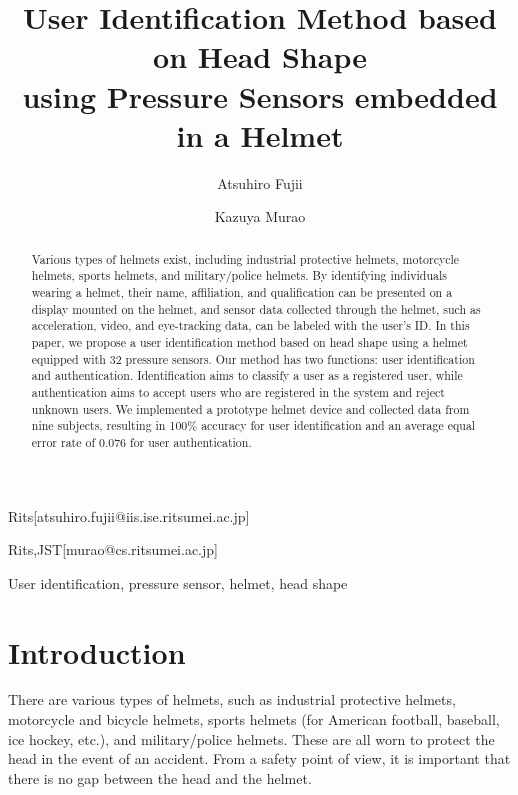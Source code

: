 \documentclass[english,preprint,JIP]{ipsj}
\begin{document}
\title{User Identification Method based on Head Shape\\
using Pressure Sensors embedded in a Helmet}


\author{Atsuhiro Fujii}{Rits}[atsuhiro.fujii@iis.ise.ritsumei.ac.jp]
\author{Kazuya Murao}{Rits,JST}[murao@cs.ritsumei.ac.jp]


\begin{abstract}
Various types of helmets exist, including industrial protective helmets, motorcycle helmets, sports helmets, and military/police helmets. By identifying individuals wearing a helmet, their name, affiliation, and qualification can be presented on a display mounted on the helmet, and sensor data collected through the helmet, such as acceleration, video, and eye-tracking data, can be labeled with the user's ID. In this paper, we propose a user identification method based on head shape using a helmet equipped with 32 pressure sensors. Our method has two functions: user identification and authentication. Identification aims to classify a user as a registered user, while authentication aims to accept users who are registered in the system and reject unknown users. We implemented a prototype helmet device and collected data from nine subjects, resulting in 100\% accuracy for user identification and an average equal error rate of 0.076 for user authentication.
\end{abstract}

\begin{keyword}
User identification, pressure sensor, helmet, head shape
\end{keyword}

\maketitle

\section{Introduction}
\label{sec:introduction}
There are various types of helmets, such as industrial protective helmets, motorcycle and bicycle helmets, sports helmets (for American football, baseball, ice hockey, etc.), and military/police helmets. These are all worn to protect the head in the event of an accident\cite{helmet}. From a safety point of view, it is important that there is no gap between the head and the helmet.\par
\end{document}
